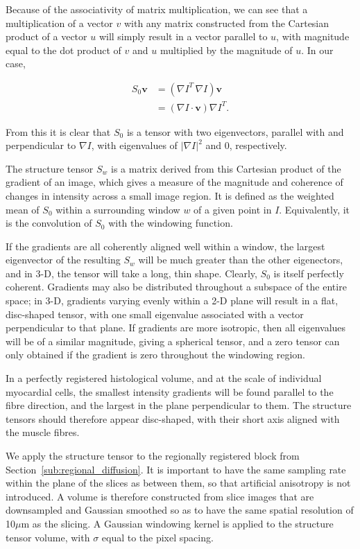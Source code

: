  Because of the associativity of matrix multiplication, we can see that a multiplication of a vector $v$ with any matrix constructed from the Cartesian product of a vector $u$ will simply result in a vector parallel to $u$, with magnitude equal to the dot product of $v$ and $u$ multiplied by the magnitude of $u$. In our case,
  
  \begin{align}
    S_0 \mathbf{v} &= (\nabla I^T \, \nabla I) \mathbf{v} \\
                   &= (\nabla I \cdot \mathbf{v}) \nabla I^T.
  \end{align}
  
  From this it is clear that $S_0$ is a tensor with two eigenvectors, parallel with and perpendicular to $\nabla I$, with eigenvalues of $|\nabla I|^2$ and 0, respectively.
  
  The structure tensor $S_w$ is a matrix derived from this Cartesian product of the gradient of an image, which gives a measure of the magnitude and coherence of changes in intensity across a small image region. It is defined as the weighted mean of $S_0$ within a surrounding window $w$ of a given point in $I$. Equivalently, it is the convolution of $S_0$ with the windowing function.
  
  If the gradients are all coherently aligned well within a window, the largest eigenvector of the resulting $S_w$ will be much greater than the other eigenectors, and in 3-D, the tensor will take a long, thin shape. Clearly, $S_0$ is itself perfectly coherent. Gradients may also be distributed throughout a subspace of the entire space; in 3-D, gradients varying evenly within a 2-D plane will result in a flat, disc-shaped tensor, with one small eigenvalue associated with a vector perpendicular to that plane. If gradients are more isotropic, then all eigenvalues will be of a similar magnitude, giving a spherical tensor, and a zero tensor can only obtained if the gradient is zero throughout the windowing region.
  
  In a perfectly registered histological volume, and at the scale of individual myocardial cells, the smallest intensity gradients will be found parallel to the fibre direction, and the largest in the plane perpendicular to them. The structure tensors should therefore appear disc-shaped, with their short axis aligned with the muscle fibres.
  
  We apply the structure tensor to the regionally registered block from Section~\ref{sub:regional_diffusion}. It is important to have the same sampling rate within the plane of the slices as between them, so that artificial anisotropy is not introduced. A volume is therefore constructed from slice images that are downsampled and Gaussian smoothed so as to have the same spatial resolution of 10$\mu$m as the slicing. A Gaussian windowing kernel is applied to the structure tensor volume, with $\sigma$ equal to the pixel spacing.

